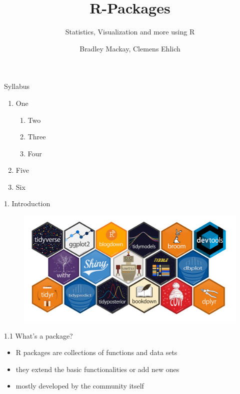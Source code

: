 \documentclass[11pt,a4paper]{beamer}
\author{Bradley Mackay, Clemens Ehlich}
\title[Short Title]{R-Packages}
\subtitle{Statistics, Visualization and more using R}
\institute{NAWI PLUS}
\date{}
\begin{document}
	

	\begin{frame}
	
		\titlepage
	\end{frame}


	\begin{frame}[t]{Syllabus}
	
		\begin{enumerate}
			\item One
			\begin{enumerate}
				\item Two
				\item Three
				\item Four
			\end{enumerate}
			\item Five
			\item Six
		\end{enumerate}
		
	\end{frame}



\begin{frame}[t]{1. Introduction}
	

\begin{figure}
	\centering
	\includegraphics[width=0.9\linewidth]{packages}
	\label{fig:packages}
\end{figure}

	
\end{frame}










		\begin{frame}[t]{1.1 What's a package?}
				
		\begin{itemize}
			\item R packages are collections of functions and data sets  
			\item they extend the basic functionalities or add new ones
			\item mostly developed by the community itself 
			
			
		\end{itemize}
		
	\end{frame}
	
\end{document}
